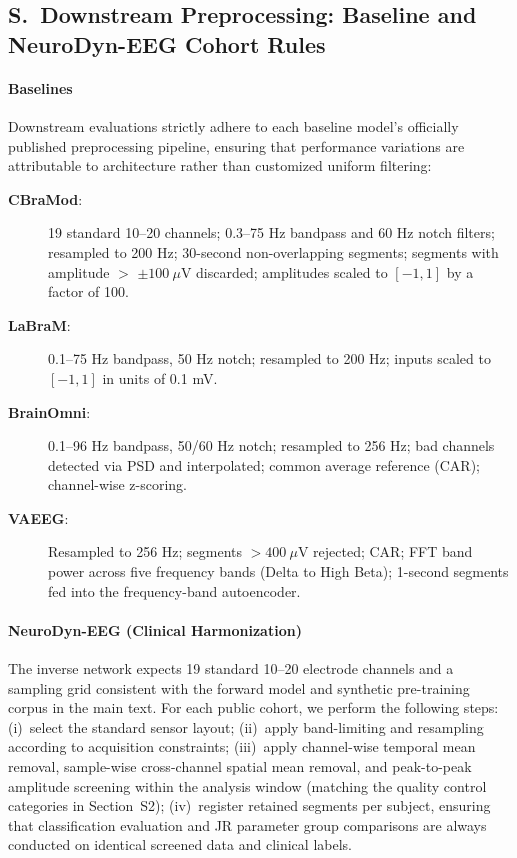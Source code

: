 \documentclass[11pt]{article}
\newcounter{suppsec}
\renewcommand{\thesuppsec}{S\arabic{suppsec}}
\newcommand{\suppsubsection}[1]{%
  \refstepcounter{suppsec}%
  \subsection*{\thesuppsec.\ #1}%
}
\begin{document}
\suppsubsection{Downstream Preprocessing: Baseline and NeuroDyn-EEG Cohort Rules}
\label{sec:supp_preprocess}
\paragraph{Baselines}
Downstream evaluations strictly adhere to each baseline model's officially published preprocessing pipeline, ensuring that performance variations are attributable to architecture rather than customized uniform filtering:

\begin{description}
    \item[\textbf{CBraMod}:] 19 standard 10--20 channels; 0.3--75 Hz bandpass and 60 Hz notch filters; resampled to 200 Hz; 30-second non-overlapping segments; segments with amplitude $>$ $\pm100~\mu$V discarded; amplitudes scaled to $[-1,1]$ by a factor of 100.
    \item[\textbf{LaBraM}:] 0.1--75 Hz bandpass, 50 Hz notch; resampled to 200 Hz; inputs scaled to $[-1,1]$ in units of 0.1 mV.
    \item[\textbf{BrainOmni}:] 0.1--96 Hz bandpass, 50/60 Hz notch; resampled to 256 Hz; bad channels detected via PSD and interpolated; common average reference (CAR); channel-wise z-scoring.
    \item[\textbf{VAEEG}:] Resampled to 256 Hz; segments $>400~\mu$V rejected; CAR; FFT band power across five frequency bands (Delta to High Beta); 1-second segments fed into the frequency-band autoencoder.
\end{description}

\paragraph{NeuroDyn-EEG (Clinical Harmonization)}
The inverse network expects 19 standard 10--20 electrode channels and a sampling grid consistent with the forward model and synthetic pre-training corpus in the main text. For each public cohort, we perform the following steps: (i)~select the standard sensor layout; (ii)~apply band-limiting and resampling according to acquisition constraints; (iii)~apply channel-wise temporal mean removal, sample-wise cross-channel spatial mean removal, and peak-to-peak amplitude screening within the analysis window (matching the quality control categories in Section~S2); (iv)~register retained segments per subject, ensuring that classification evaluation and JR parameter group comparisons are always conducted on identical screened data and clinical labels.
\end{document}
